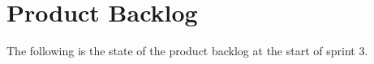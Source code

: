 \section{Product Backlog}
The following is the state of the product backlog at the start of sprint 3.

